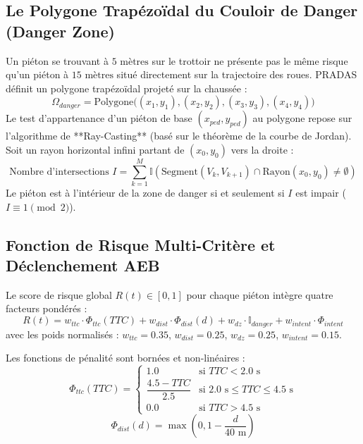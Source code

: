 \documentclass[11pt,a4paper]{article}
\begin{document}
\subsection{Le Polygone Trapézoïdal du Couloir de Danger (Danger Zone)}
Un piéton se trouvant à $5\text{ mètres}$ sur le trottoir ne présente pas le même risque qu'un piéton à $15\text{ mètres}$ situé directement sur la trajectoire des roues. PRADAS définit un polygone trapézoïdal projeté sur la chaussée :
\begin{equation}
    \Omega_{danger} = \text{Polygone}\Big( (x_1, y_1), (x_2, y_2), (x_3, y_3), (x_4, y_4) \Big)
\end{equation}
Le test d'appartenance d'un piéton de base $(x_{ped}, y_{ped})$ au polygone repose sur l'algorithme de **Ray-Casting** (basé sur le théorème de la courbe de Jordan). Soit un rayon horizontal infini partant de $(x_0, y_0)$ vers la droite :
\begin{equation}
    \text{Nombre d'intersections } I = \sum_{k=1}^{M} \mathbb{I}\left( \text{Segment}(V_k, V_{k+1}) \cap \text{Rayon}(x_0, y_0) \neq \emptyset \right)
\end{equation}
Le piéton est à l'intérieur de la zone de danger si et seulement si $I$ est impair ($I \equiv 1 \pmod 2$).

\subsection{Fonction de Risque Multi-Critère et Déclenchement AEB}
Le score de risque global $R(t) \in [0, 1]$ pour chaque piéton intègre quatre facteurs pondérés :
\begin{equation}
    R(t) = w_{ttc} \cdot \Phi_{ttc}(TTC) + w_{dist} \cdot \Phi_{dist}(d) + w_{dz} \cdot \mathbb{I}_{danger} + w_{intent} \cdot \Phi_{intent}
\end{equation}
avec les poids normalisés : $w_{ttc} = 0.35$, $w_{dist} = 0.25$, $w_{dz} = 0.25$, $w_{intent} = 0.15$.

Les fonctions de pénalité sont bornées et non-linéaires :
\begin{equation}
    \Phi_{ttc}(TTC) = \begin{cases}
        1.0 & \text{si } TTC < 2.0\text{ s} \\
        \dfrac{4.5 - TTC}{2.5} & \text{si } 2.0\text{ s} \le TTC \le 4.5\text{ s} \\
        0.0 & \text{si } TTC > 4.5\text{ s}
    \end{cases}
\end{equation}
\begin{equation}
    \Phi_{dist}(d) = \max\left(0, 1 - \frac{d}{40\text{ m}}\right)
\end{equation}
\end{document}
